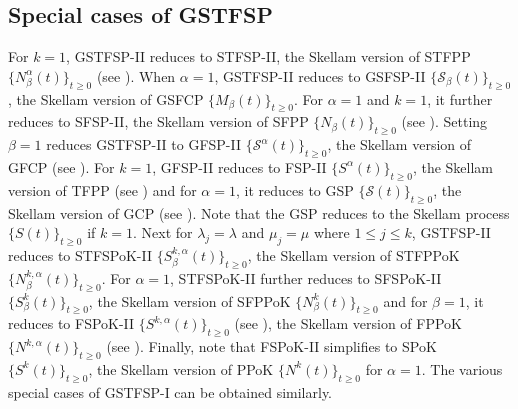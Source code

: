 \documentclass[11pt,oneside,reqno]{amsart}
\theoremstyle{definition}
\theoremstyle{remarkstyle}
\begin{document}
\subsection{Special cases of GSTFSP}\label{special cases_GSTFCP}
For $k=1$, GSTFSP-II reduces to STFSP-II, the Skellam version of STFPP $\{N_\beta^\alpha(t)\}_{t\geq 0}$ (see \citet{Orsingher2012}). When $\alpha=1$, GSTFSP-II reduces to GSFSP-II $\{\mathcal{S}_{\beta}(t)\}_{t\geq 0}$, the Skellam version of GSFCP $\{M_{\beta}(t)\}_{t\geq 0}$. For $\alpha=1$ and $k=1$, it further reduces to SFSP-II, the Skellam version of SFPP $\{N_\beta(t)\}_{t\geq 0}$ (see \citet{Orsingher2012}). Setting $\beta=1$ reduces GSTFSP-II to GFSP-II $\{\mathcal{S}^\alpha(t)\}_{t\geq 0}$, the Skellam version of GFCP (see \citet{KatariaGFCP}). For $k=1$, GFSP-II reduces to FSP-II $\{S^\alpha(t)\}_{t\geq 0}$, the Skellam version of TFPP (see \citet{LASKIN2003}) and for $\alpha=1$, it reduces to GSP $\{\mathcal{S}(t)\}_{t\geq 0}$, the Skellam version of GCP (see  \citet{Crescenzo2016}). Note that the GSP reduces to the Skellam process $\{S(t)\}_{t\geq 0}$ if $k=1$. Next for $\lambda_j=\lambda$ and $\mu_j=\mu$ where $1\le j \le k$, GSTFSP-II reduces to STFSPoK-II $\{S_{\beta}^{k,\alpha}(t)\}_{t\geq 0}$, the Skellam version of STFPPoK $\{N_{\beta}^{k,\alpha}(t)\}_{t\geq 0}$. For $\alpha=1$, STFSPoK-II further reduces to SFSPoK-II $\{S_{\beta}^{k}(t)\}_{t\geq 0}$, the Skellam version of SFPPoK $\{N_{\beta}^{k}(t)\}_{t\geq 0}$ and for $\beta=1$, it reduces to FSPoK-II $\{S^{k,\alpha}(t)\}_{t\geq 0}$ (see \citet{kataria2024}), the Skellam version of FPPoK $\{N^{k,\alpha}(t)\}_{t\geq 0}$ (see \citet{Gupta2023}). Finally, note that FSPoK-II simplifies to SPoK $\{S^{k}(t)\}_{t\geq 0}$, the Skellam version of PPoK $\{N^{k}(t)\}_{t\geq 0}$ for $\alpha=1$. The various special cases of GSTFSP-I can be obtained similarly.   
\end{document}
